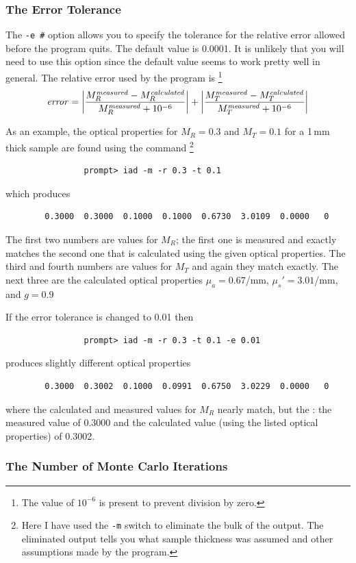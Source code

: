 \documentclass{article}
\begin{document}
\subsubsection{The Error Tolerance }
The \texttt{-e \#} option allows you to specify the tolerance for the relative error allowed
before the program quits.  The default value is 0.0001. It is unlikely that you will need to
use this option since the default value seems to work pretty well in general.
The relative error used by the program is%
\footnote{The value of $10^{-6}$ is present to prevent division by zero.} 
$$
\mathit{error} = \left| {M_R^\mathit{measured}-M_R^\mathit{calculated} \over M_R^\mathit{measured} + 10^{-6}} \right|
               + \left| {M_T^\mathit{measured}-M_T^\mathit{calculated} \over M_T^\mathit{measured} + 10^{-6}} \right|
$$

As an example, the optical properties for $M_R=0.3$ and $M_T=0.1$ for a 1\,mm thick sample
are found using the command%
\footnote{Here I have used the \texttt{-m} switch to eliminate the bulk
of the output.  The eliminated output tells you what sample thickness was assumed and other 
assumptions made by the program.}
\begin{verbatim}
                prompt> iad -m -r 0.3 -t 0.1
\end{verbatim}
which produces
\begin{verbatim}
        0.3000  0.3000  0.1000  0.1000  0.6730  3.0109  0.0000   0
\end{verbatim}
The first two numbers
are values for $M_R$; the first one is measured and exactly matches the
second one that is calculated using the given optical properties.  The third
and fourth numbers are values for $M_T$ and again they match exactly.  The next
three are the calculated optical properties 
$\mu_a=0.67$/mm, $\mu_s'=3.01$/mm, and $g=0.9$

If the
error tolerance is changed to 0.01 then
\begin{verbatim}
                prompt> iad -m -r 0.3 -t 0.1 -e 0.01
\end{verbatim}
produces slightly different optical properties
\begin{verbatim}
        0.3000  0.3002  0.1000  0.0991  0.6750  3.0229  0.0000   0
\end{verbatim}
where the calculated and measured values for $M_R$ nearly match, but the
: the measured value of
0.3000 and the calculated value (using the listed optical properties) of
0.3002.  

\subsubsection{The Number of Monte Carlo Iterations}
\end{document}

